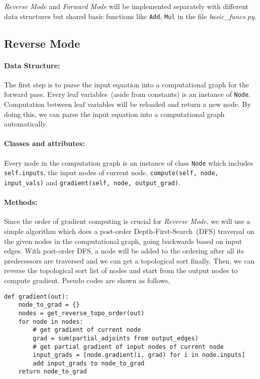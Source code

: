 \textit{Reverse Mode} and \textit{Forward Mode} will be implemented separately with different data structures but shared basic functions like \texttt{Add}, \texttt{Mul} in the file \textit{basic\_funcs.py}.

\subsection{Reverse Mode}
\paragraph{Data Structure:}The first step is to parse the input equation into a computational graph for the forward pass. Every leaf variables~(aside from constants) is an instance of \texttt{Node}. Computation between leaf variables will be reloaded and return a new node. By doing this, we can parse the input equation into a computational graph automatically. 
\paragraph{Classes and attributes:}Every node in the computation graph is an instance of class \texttt{Node} which includes \texttt{self.inputs}, the input nodes of current node.
\newline\texttt{compute(self, node, input_vals)} and \texttt{gradient(self, node, output_grad)}. 
\paragraph{Methods:}Since the order of gradient computing is crucial for \textit{Reverse Mode}, we will use a simple algorithm which does a post-order Depth-First-Search~(DFS) traversal on the given nodes in the computational graph, going backwards based on input edges. With post-order DFS, a node will be added to the ordering after all its predecessors are traversed and we can get a topological sort finally. Then, we can reverse the topological sort list of nodes and start from the output nodes to compute gradient. Pseudo codes are shown as follows,
\begin{verbatim}
def gradient(out):
    node_to_grad = {}
    nodes = get_reverse_topo_order(out)
    for node in nodes:
        # get gradient of current node
        grad = sum(partial_adjoints from output_edges)  
        # get partial gradient of input nodes of current node
        input_grads = [node.gradient(i, grad) for i in node.inputs]
        add input_grads to node_to_grad
    return node_to_grad
\end{verbatim}
